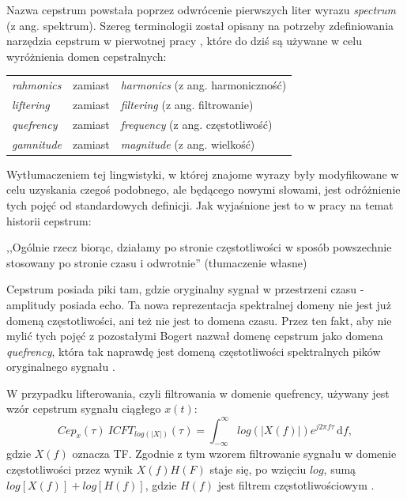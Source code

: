 \documentclass[12pt,a4paper,twoside]{mwart}
\begin{document}
Nazwa cepstrum powstała poprzez odwrócenie pierwszych liter wyrazu \textit{spectrum} (z ang. spektrum). Szereg terminologii został opisany na potrzeby zdefiniowania narzędzia cepstrum w pierwotnej pracy \cite{Transcription:Bogert:FirstCepstrum}, które do dziś są używane w celu wyróżnienia domen cepstralnych:
\begin{table}[H]\centering
  \begin{tabular}{lll}
  \textit{rahmonics} & zamiast & \textit{harmonics} (z ang. harmoniczność) \\
  \textit{liftering} & zamiast & \textit{filtering} (z ang. filtrowanie) \\
  \textit{quefrency} & zamiast & \textit{frequency} (z ang. częstotliwość) \\
  \textit{gamnitude} & zamiast & \textit{magnitude} (z ang. wielkość)
  \end{tabular}
\end{table}
\noindent Wytłumaczeniem tej lingwistyki, w której znajome wyrazy były modyfikowane w celu uzyskania czegoś podobnego, ale będącego nowymi słowami, jest odróżnienie tych pojęć od standardowych definicji. Jak wyjaśnione jest to w pracy na temat historii cepstrum: 
\begin{displayquote}
,,Ogólnie rzecz biorąc, działamy po stronie częstotliwości w sposób powszechnie stosowany po stronie czasu i odwrotnie'' 
\cite[95]{Transcription:Oppenheim:HistoryOfCepstrum} 
(tłumaczenie własne)
\end{displayquote}

Cepstrum posiada piki tam, gdzie oryginalny sygnał w przestrzeni czasu - amplitudy posiada echo. Ta nowa reprezentacja spektralnej domeny nie jest już domeną częstotliwości, ani też nie jest to domena czasu. Przez ten fakt, aby nie mylić tych pojęć z pozostałymi Bogert nazwał domenę cepstrum jako domena \textit{quefrency}, która tak naprawdę jest domeną częstotliwości spektralnych pików oryginalnego sygnału 
\cite[1-4]{Transcription:Randall:CepstrumHistory}
.

W przypadku lifterowania, czyli filtrowania w domenie quefrency, używany jest wzór cepstrum sygnału ciągłego $x(t)$:
\begin{equation}\label{eq:ceps:continous}
Cep_x(\tau) \ ICFT_{log(|X|)}(\tau) = \int_{-\infty}^{\infty}  log(|X(f)|)e^{j2\pi f\tau}\,\mathrm{d}f, 
\end{equation}
gdzie  $X(f)$ oznacza TF. Zgodnie z tym wzorem filtrowanie sygnału w domenie częstotliwości przez wynik $X(f)H(F)$ staje się, po wzięciu $log$, sumą $log[X(f)] + log[H(f)]$, gdzie $H(f)$ jest filtrem częstotliwościowym
\cite[25-27]{Transcription:Anssi:SignalProcessingMethods}.
\end{document}
